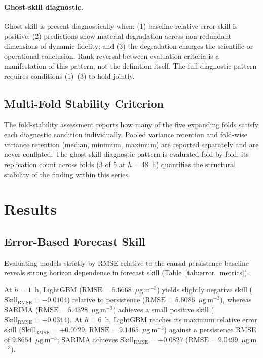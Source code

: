 \documentclass[12pt]{article}
\begin{document}
\paragraph{Ghost-skill diagnostic.}
Ghost skill is present diagnostically when: (1) baseline-relative
error skill is positive; (2) predictions show material degradation
across non-redundant dimensions of dynamic fidelity; and (3) the
degradation changes the scientific or operational conclusion.
Rank reversal between evaluation criteria is a manifestation of
this pattern, not the definition itself. The full diagnostic pattern
requires conditions (1)--(3) to hold jointly.

\subsection{Multi-Fold Stability Criterion}
\label{sec:fold_stability}

The fold-stability assessment reports how many of the five expanding
folds satisfy each diagnostic condition individually.
Pooled variance retention and fold-wise variance retention (median,
minimum, maximum) are reported separately and are never conflated.
The ghost-skill diagnostic pattern is evaluated fold-by-fold; its
replication count across folds (3 of 5 at $h = 48$~h) quantifies
the structural stability of the finding within this series.

\section{Results}
\label{sec:results}

\subsection{Error-Based Forecast Skill}
\label{sec:results_error_skill}

Evaluating models strictly by RMSE relative to the causal persistence
baseline reveals strong horizon dependence in forecast skill
(Table~\ref{tab:error_metrics}).

At $h = 1$~h, LightGBM ($\mathrm{RMSE} = 5.6668$~$\mu$g\,m$^{-3}$)
yields slightly negative skill ($\mathrm{Skill}_\mathrm{RMSE} = -0.0104$)
relative to persistence ($\mathrm{RMSE} = 5.6086$~$\mu$g\,m$^{-3}$),
whereas SARIMA ($\mathrm{RMSE} = 5.4328$~$\mu$g\,m$^{-3}$) achieves
a small positive skill ($\mathrm{Skill}_\mathrm{RMSE} = +0.0314$).
At $h = 6$~h, LightGBM reaches its maximum relative error skill
($\mathrm{Skill}_\mathrm{RMSE} = +0.0729$,
$\mathrm{RMSE} = 9.1465$~$\mu$g\,m$^{-3}$) against a persistence
RMSE of $9.8654$~$\mu$g\,m$^{-3}$; SARIMA achieves
$\mathrm{Skill}_\mathrm{RMSE} = +0.0827$
($\mathrm{RMSE} = 9.0499$~$\mu$g\,m$^{-3}$).
\end{document}
